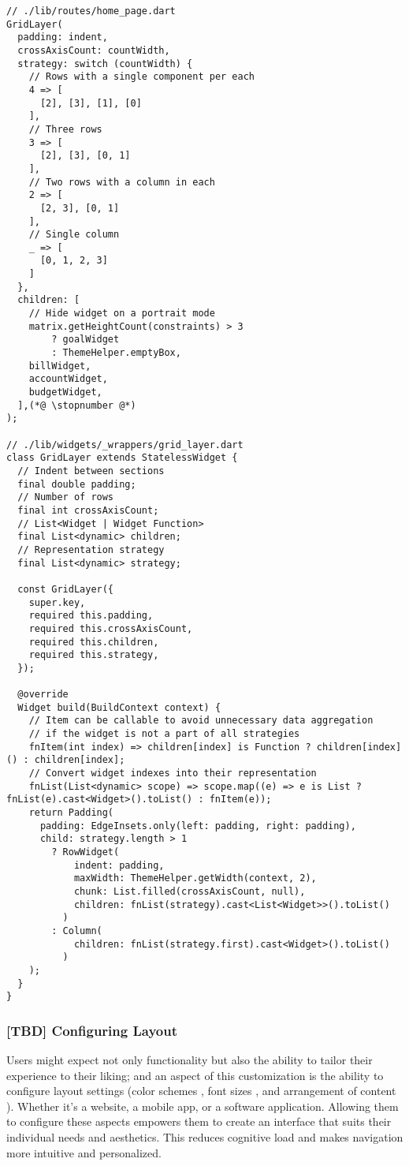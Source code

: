 \begin{lstlisting}
// ./lib/routes/home_page.dart
GridLayer(
  padding: indent,
  crossAxisCount: countWidth,
  strategy: switch (countWidth) {
    // Rows with a single component per each
    4 => [
      [2], [3], [1], [0]
    ],
    // Three rows
    3 => [
      [2], [3], [0, 1]
    ],
    // Two rows with a column in each
    2 => [
      [2, 3], [0, 1]
    ],
    // Single column
    _ => [
      [0, 1, 2, 3]
    ]
  },
  children: [
    // Hide widget on a portrait mode
    matrix.getHeightCount(constraints) > 3
        ? goalWidget
        : ThemeHelper.emptyBox,
    billWidget,
    accountWidget,
    budgetWidget,
  ],(*@ \stopnumber @*)
);

// ./lib/widgets/_wrappers/grid_layer.dart
class GridLayer extends StatelessWidget {
  // Indent between sections
  final double padding;
  // Number of rows
  final int crossAxisCount;
  // List<Widget | Widget Function>
  final List<dynamic> children;
  // Representation strategy
  final List<dynamic> strategy;

  const GridLayer({
    super.key,
    required this.padding,
    required this.crossAxisCount,
    required this.children,
    required this.strategy,
  });

  @override
  Widget build(BuildContext context) {
    // Item can be callable to avoid unnecessary data aggregation
    // if the widget is not a part of all strategies
    fnItem(int index) => children[index] is Function ? children[index]() : children[index];
    // Convert widget indexes into their representation
    fnList(List<dynamic> scope) => scope.map((e) => e is List ? fnList(e).cast<Widget>().toList() : fnItem(e));
    return Padding(
      padding: EdgeInsets.only(left: padding, right: padding),
      child: strategy.length > 1
        ? RowWidget(
            indent: padding,
            maxWidth: ThemeHelper.getWidth(context, 2),
            chunk: List.filled(crossAxisCount, null),
            children: fnList(strategy).cast<List<Widget>>().toList()
          )
        : Column(
            children: fnList(strategy.first).cast<Widget>().toList()
          )
    );
  }
}
\end{lstlisting}


\subsubsection{[TBD] Configuring Layout}

Users might expect not only functionality but also the ability to tailor their experience to their liking; and an 
aspect of this customization is the ability to configure layout settings (color schemes , font sizes 
, and arrangement of content ). Whether it's a website, a mobile app, or a software 
application. Allowing them to configure these aspects empowers them to create an interface that suits their individual 
needs and aesthetics. This reduces cognitive load and makes navigation more intuitive and personalized.


